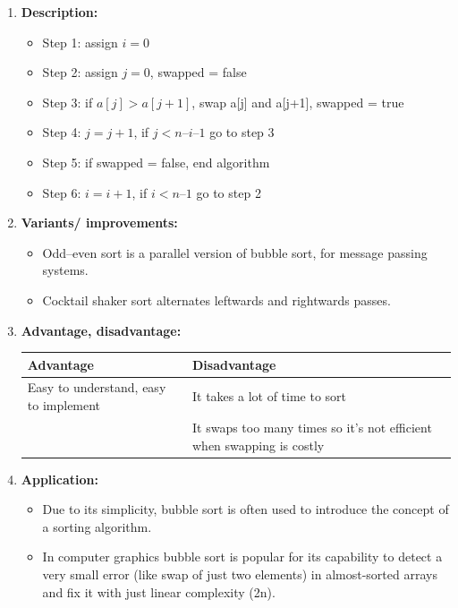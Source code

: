 \documentclass[11pt,a4paper]{article}
\begin{document}
{\begin{enumerate}[label=\textbf{\arabic*})]
				\item \textbf{Description:}
						\begin{itemize}
							\item Step 1: assign $i = 0$
                            \item Step 2: assign $j = 0$, swapped = false
                            \item Step 3: if $a[j] > a[j+1]$, swap a[j] and a[j+1], swapped = true
                            \item Step 4: $j = j + 1$, if $j < n – i – 1$ go to step 3
                            \item Step 5: if swapped = false, end algorithm
                            \item Step 6: $i = i + 1$, if $i < n – 1$ go to step 2
						\end{itemize}
				\item \textbf{Variants/ improvements:}
					\begin{itemize}
						\item Odd–even sort is a parallel version of bubble sort, for message passing systems.
						\item Cocktail shaker sort alternates leftwards and rightwards passes.
					\end{itemize}
				\item \textbf{Advantage, disadvantage:}
					\begin{table}[H]
						\centering
						\begin{tabular}{|p{8cm}|p{8cm}|}
							\hline
							\textbf{Advantage} & \textbf{Disadvantage} \\
							\hline
							\hline
							Easy to understand, easy to implement & It takes a lot of time to sort \\[12pt]
							& It swaps too many times so it’s not efficient when swapping is costly\\
							\hline
						\end{tabular}
					\end{table}
				\item \textbf{Application:}	
					\begin{itemize}
						\item Due to its simplicity, bubble sort is often used to introduce the concept of a sorting algorithm.
						\item In computer graphics bubble sort is popular for its capability to detect a very small error (like swap of just two elements) in almost-sorted arrays and fix it with just linear complexity (2n).
					\end{itemize}
			\end{enumerate}
		
}
\end{document}
